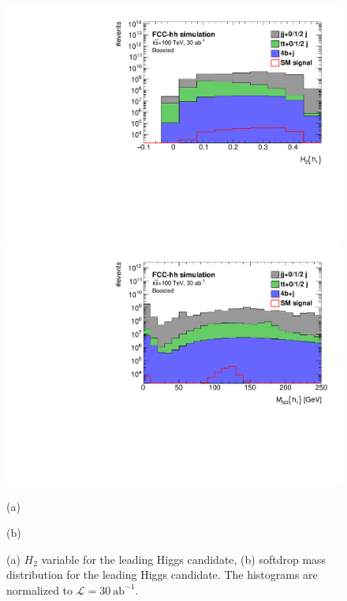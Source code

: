 \begin{figure}
	\centering
	\begin{minipage}{.5\textwidth}
		\centering
		\includegraphics[trim={.65cm 0 0 0},clip,width=\linewidth]{./Figures/hist_h1_FW2_stack.pdf}
	\end{minipage}%
	\begin{minipage}{.5\textwidth}
		\centering
		\includegraphics[trim={0 0 .65cm 0},clip,width=\linewidth]{./Figures/hist_h1_softdrop_M_stack.pdf}
	\end{minipage}
	\begin{minipage}[t]{0.5\textwidth}
		\caption*{(a)}
	\end{minipage}%
	\hfill
	\begin{minipage}[t]{0.5\textwidth}
		\caption*{(b)}
	\end{minipage}
	\caption{(a) $H_2$ variable for the leading Higgs candidate, (b) softdrop mass distribution for the leading Higgs candidate. The histograms are normalized to $\mathcal{L}=30~\text{ab}^{-1}$.}
	\label{fig:M_stack}
\end{figure} 

